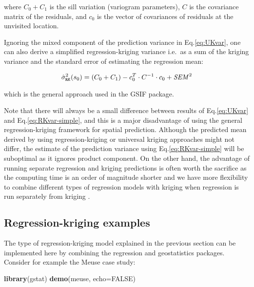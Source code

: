 \documentclass[graybox,natbib,nospthms,UStrade]{svmono}
\newenvironment{Shaded}{\begin{snugshade}}{\end{snugshade}}
\newcommand{\DataTypeTok}[1]{\textcolor[rgb]{0.27,0.27,0.27}{#1}}
\newcommand{\KeywordTok}[1]{\textcolor[rgb]{0.27,0.27,0.27}{\textbf{#1}}}
\newcommand{\NormalTok}[1]{#1}
\newcommand{\OtherTok}[1]{\textcolor[rgb]{0.37,0.37,0.37}{#1}}
\begin{document}
where \(C_0 + C_1\) is the sill variation (variogram parameters), \({C}\)
is the covariance matrix of the residuals, and \({{c}}_0\) is the
vector of covariances of residuals at the unvisited location.

Ignoring the mixed component of the prediction variance in
Eq.\eqref{eq:UKvar}, one can also derive a simplified regression-kriging
variance i.e.~as a sum of the kriging variance and the standard error of
estimating the regression mean:

\begin{equation}
\hat \sigma _{\tt{RK}}^2 ({{s}}_0) = (C_0  + C_1 ) -
{{c}}_{{0}}^{{T}}  \cdot {{C}}^{ - {{1}}}  \cdot
{{c}}_{{0}} + {\it{SEM}}^2
\label{eq:RKvar-simple}
\end{equation}

which is the general approach used in the GSIF package.

Note that there will always be a small difference between results of
Eq.\eqref{eq:UKvar} and Eq.\eqref{eq:RKvar-simple}, and this is a major
disadvantage of using the general regression-kriging framework for
spatial prediction. Although the predicted mean derived by using
regression-kriging or universal kriging approaches might not differ, the
estimate of the prediction variance using Eq.\eqref{eq:RKvar-simple} will
be suboptimal as it ignores product component. On the other hand, the
advantage of running separate regression and kriging predictions is
often worth the sacrifice as the computing time is an order of magnitude
shorter and we have more flexibility to combine different types of
regression models with kriging when regression is run separately from
kriging \citep{hengl2007regression}.

\hypertarget{regression-kriging-examples}{%
\subsection{Regression-kriging examples}\label{regression-kriging-examples}}

The type of regression-kriging model explained in the previous section
can be implemented here by combining the regression and geostatistics packages. Consider for
example the Meuse case study:

\begin{Shaded}
\begin{Highlighting}[]
\KeywordTok{library}\NormalTok{(gstat)}
\KeywordTok{demo}\NormalTok{(meuse, }\DataTypeTok{echo=}\OtherTok{FALSE}\NormalTok{)}
\end{Highlighting}
\end{Shaded}
\end{document}
